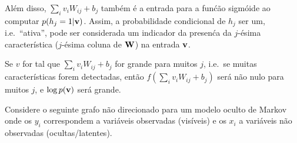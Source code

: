 \begin{exenumerate}
\begin{solution}
        Al\'em disso, $\sum_i v_i W_{ij} +b_j$ tamb\'em \'e a entrada para a
        fun\'c\~ao sigm\'oide ao computar $p(h_j=1 | \mathbf{v})$. Assim, a
        probabilidade condicional de $h_j$ ser um, i.e.\ ``ativa'',
        pode ser considerada um indicador da presen\'ca da
        $j$-\'esima caracter\'istica ($j$-\'esima coluna de $\mathbf{W}$) na entrada $\mathbf{v}$.
        
        Se $v$ for tal que $\sum_i v_i W_{ij} +b_j$ for grande para muitos
        $j$, i.e.\ se muitas caracter\'isticas forem detectadas, ent\~ao $f\left(\sum_i
        v_i W_{ij} + b_j \right)$ ser\'a n\~ao nulo para muitos $j$, e
        $\log p(\mathbf{v})$ ser\'a grande.
        
        
        \begin{center}
            \vspace{3ex}
        \end{center}
        
        
    \end{solution}
    
    
    
\end{exenumerate}




Considere o seguinte grafo n\~ao direcionado para um modelo oculto de Markov onde os $y_i$ correspondem a vari\'aveis observadas (vis\'iveis) e os $x_i$ a vari\'aveis n\~ao observadas (ocultas/latentes).

